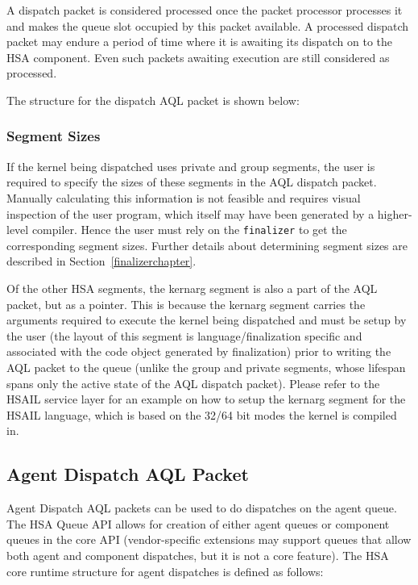 \documentclass{book}
\begin{document}
A dispatch packet is considered processed once the packet processor
processes it and makes the queue slot occupied by this packet
available. A processed dispatch packet may endure a period of time
where it is awaiting its dispatch on to the HSA component. Even such
packets awaiting execution are still considered as processed.

The structure for the dispatch AQL packet is shown below:


\hypertarget{segment_sizes}{}\subsubsection{Segment
Sizes}\label{segment_sizes}
If the kernel being dispatched uses private and group segments, the
user is required to specify the sizes of these segments in the AQL
dispatch packet. Manually calculating this information is not
feasible and requires visual inspection of the user program, which itself
may have been generated by a higher-level compiler. Hence the user
must rely on the \texttt{finalizer} to get the corresponding segment
sizes. Further details about determining segment sizes are described in
Section~\ref{finalizerchapter}.

Of the other HSA segments, the kernarg segment is also a part of the
AQL packet, but as a pointer. This is because the kernarg segment
carries the arguments required to execute the kernel being dispatched
and must be setup by the user (the layout of this segment is
language/finalization specific and associated with the code object
generated by finalization) prior to writing the AQL packet to the
queue (unlike the group and private segments, whose lifespan spans
only the active state of the AQL dispatch packet).  Please refer to
the HSAIL service layer for an example on how to setup the kernarg
segment for the HSAIL language, which is based on the 32/64 bit modes
the kernel is compiled in.

\hypertarget{agent_packet}{}\subsection{Agent Dispatch AQL
Packet}\label{agent_packet}
Agent Dispatch AQL packets can be used to do dispatches on the agent
queue. The HSA Queue API allows for creation of either agent queues
or component queues in the core API (vendor-specific extensions may
support queues that allow both agent and component dispatches, but
it is not a core feature). The HSA core runtime structure for agent
dispatches is defined as follows:
\end{document}
